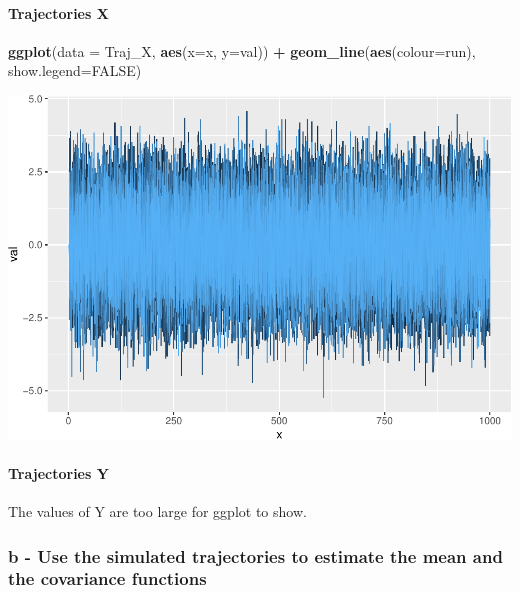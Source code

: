 \documentclass[]{article}
\newenvironment{Shaded}{\begin{snugshade}}{\end{snugshade}}
\newcommand{\DataTypeTok}[1]{\textcolor[rgb]{0.13,0.29,0.53}{#1}}
\newcommand{\KeywordTok}[1]{\textcolor[rgb]{0.13,0.29,0.53}{\textbf{#1}}}
\newcommand{\NormalTok}[1]{#1}
\newcommand{\OperatorTok}[1]{\textcolor[rgb]{0.81,0.36,0.00}{\textbf{#1}}}
\newcommand{\OtherTok}[1]{\textcolor[rgb]{0.56,0.35,0.01}{#1}}
\newcommand{\StringTok}[1]{\textcolor[rgb]{0.31,0.60,0.02}{#1}}
\let\oldparagraph\paragraph
\renewcommand{\paragraph}[1]{\oldparagraph{#1}\mbox{}}
\begin{document}
\hypertarget{trajectories-x}{%
\paragraph{Trajectories X}\label{trajectories-x}}

\begin{Shaded}
\begin{Highlighting}[]
\KeywordTok{ggplot}\NormalTok{(}\DataTypeTok{data =}\NormalTok{ Traj_X, }\KeywordTok{aes}\NormalTok{(}\DataTypeTok{x=}\NormalTok{x, }\DataTypeTok{y=}\NormalTok{val)) }\OperatorTok{+}\StringTok{ }
\StringTok{    }\KeywordTok{geom_line}\NormalTok{(}\KeywordTok{aes}\NormalTok{(}\DataTypeTok{colour=}\NormalTok{run), }\DataTypeTok{show.legend=}\OtherTok{FALSE}\NormalTok{)}
\end{Highlighting}
\end{Shaded}

\includegraphics{ex1_report_files/figure-latex/unnamed-chunk-3-1.pdf}

\hypertarget{trajectories-y}{%
\paragraph{Trajectories Y}\label{trajectories-y}}

The values of Y are too large for ggplot to show.

\hypertarget{b---use-the-simulated-trajectories-to-estimate-the-mean-and-the-covariance-functions}{%
\subsubsection{b - Use the simulated trajectories to estimate the mean
and the covariance
functions}\label{b---use-the-simulated-trajectories-to-estimate-the-mean-and-the-covariance-functions}}
\end{document}
